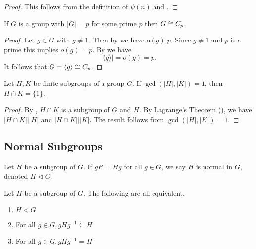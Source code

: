 \documentclass[11pt]{article}
\begin{document}
\begin{proof}
    This follows from the definition of $\psi(n)$ and .
\end{proof}

\begin{proposition}
    If $G$ is a group with $|G|=p$ for some prime $p$ then $G\cong C_p$.
\end{proposition}

\begin{proof}
    Let $g\in G$ with $g\neq 1$. Then by  we have $o(g)|p$. Since $g\neq 1$ and $p$ is a prime this implies $o(g)=p$. By  we have
    \[|\langle g\rangle|=o(g)=p.\]
    It follows that $G=\langle g\rangle\cong C_p$.
\end{proof}

\begin{proposition}
    Let $H,K$ be finite subgroups of a group $G$. If $\gcd(|H|,|K|)=1$, then $H\cap K=\{1\}$.
\end{proposition}

\begin{proof}
    By , $H\cap K$ is a subgroup of $G$ and $H$. By Lagrange's Theorem (), we have $|H\cap K|\big||H|$ and $|H\cap K|\big||K|$. The result follows from $\gcd(|H|,|K|)=1$.
\end{proof}

\subsection{Normal Subgroups}

\begin{definition}
    Let $H$ be a subgroup of $G$. If $gH=Hg$ for all $g\in G$, we say $H$ is \ul{normal} in $G$, denoted $H\lhd G$.
\end{definition}

\begin{theorem}
    Let $H$ be a subgroup of $G$. The following are all equivalent.
    \begin{enumerate}
        \item $H\lhd G$
        \item For all $g\in G,gHg^{-1}\subseteq H$
        \item For all $g\in G, gHg^{-1}=H$
    \end{enumerate}
\end{theorem}
\end{document}
